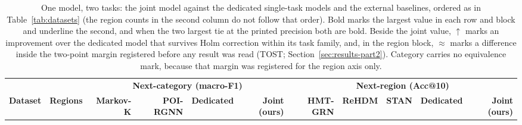 \begin{table}[!t]
\caption{One model, two tasks: the joint model against the dedicated single-task models and the
external baselines, ordered as in Table~\ref{tab:datasets} (the region counts in the second column
do not follow that order). Bold marks the largest value in each row and block and underline the
second, and when the two largest tie at the printed precision both are bold. Beside the joint value,
$\uparrow$ marks an improvement over the dedicated model that survives Holm correction within its
task family, and, in the region block, $\approx$ marks a difference inside the two-point margin
registered before any result was read (TOST; Section~\ref{sec:results-part2}). Category carries no
equivalence mark, because that margin was registered for the region axis only.}
\label{tab:results}
\centering
\begin{tabular}{l r | r r r r | r r r r r}
\hline
& & \multicolumn{4}{c|}{\textbf{Next-category (macro-F1)}} & \multicolumn{5}{c}{\textbf{Next-region (Acc@10)}} \\
\textbf{Dataset} & \textbf{Regions} & \textbf{Markov-K} & \textbf{POI-RGNN} & \textbf{Dedicated} & \textbf{Joint (ours)} & \textbf{HMT-GRN} & \textbf{ReHDM} & \textbf{STAN} & \textbf{Dedicated} & \textbf{Joint (ours)} \\

\end{tabular}
\end{table}
